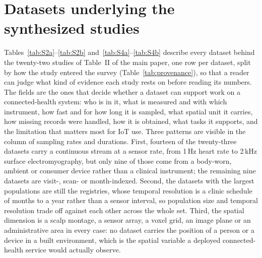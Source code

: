 \documentclass[journal]{IEEEtran}
\begin{document}
\section{Datasets underlying the synthesized studies}
\label{sec:datasets}
Tables~\ref{tab:S2a}--\ref{tab:S2b} and~\ref{tab:S4a}--\ref{tab:S4b} describe every dataset behind the
twenty-two studies of Table~II of the main paper, one row per dataset, split by
how the study entered the survey (Table~\ref{tab:provenance}), so that a reader can judge
what kind of evidence each study rests on before reading its numbers. The
fields are the ones that decide whether a dataset can support work on a
connected-health system: who is in it, what is measured and with which
instrument, how fast and for how long it is sampled, what spatial unit it
carries, how missing records were handled, how it is obtained, what tasks it
supports, and the limitation that matters most for IoT use. Three patterns are
visible in the column of sampling rates and durations. First, fourteen of the
twenty-three datasets carry a continuous stream at a sensor rate, from 1\,Hz
heart rate to 2\,kHz surface electromyography, but only nine of those come from
a body-worn, ambient or consumer device rather than a clinical instrument; the
remaining nine datasets are visit-, scan- or month-indexed. Second, the
datasets with the largest populations are still the registries, whose temporal
resolution is a clinic schedule of months to a year rather than a sensor
interval, so population size and temporal resolution trade off against each
other across the whole set. Third, the spatial dimension is a scalp montage, a
sensor array, a voxel grid, an image plane or an administrative area in every
case: no dataset carries the position of a person or a device in a built
environment, which is the spatial variable a deployed connected-health service
would actually observe.
\end{document}
